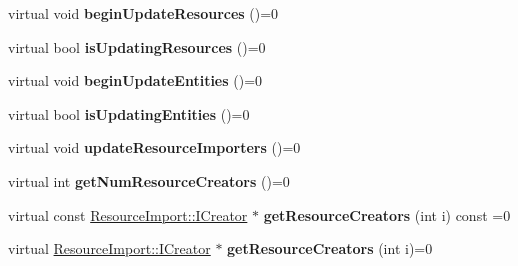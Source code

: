 \begin{DoxyCompactItemize}
\item 
virtual void {\bfseries begin\+Update\+Resources} ()=0\hypertarget{class_magnum_1_1_project_model_base_a36f50ea9a891c73149a3cf81edc87412}{}\label{class_magnum_1_1_project_model_base_a36f50ea9a891c73149a3cf81edc87412}

\item 
virtual bool {\bfseries is\+Updating\+Resources} ()=0\hypertarget{class_magnum_1_1_project_model_base_aa5b2e93a3fdf7637d91cefd2cbe365bf}{}\label{class_magnum_1_1_project_model_base_aa5b2e93a3fdf7637d91cefd2cbe365bf}

\item 
virtual void {\bfseries begin\+Update\+Entities} ()=0\hypertarget{class_magnum_1_1_project_model_base_ab17b06b43ba987c072d0725a8207a192}{}\label{class_magnum_1_1_project_model_base_ab17b06b43ba987c072d0725a8207a192}

\item 
virtual bool {\bfseries is\+Updating\+Entities} ()=0\hypertarget{class_magnum_1_1_project_model_base_a7b7be07814c6385ee6318e4ee1d571ac}{}\label{class_magnum_1_1_project_model_base_a7b7be07814c6385ee6318e4ee1d571ac}

\item 
virtual void {\bfseries update\+Resource\+Importers} ()=0\hypertarget{class_magnum_1_1_project_model_base_a05745d163734f5e11fa477f8cb53aa0e}{}\label{class_magnum_1_1_project_model_base_a05745d163734f5e11fa477f8cb53aa0e}

\item 
virtual int {\bfseries get\+Num\+Resource\+Creators} ()=0\hypertarget{class_magnum_1_1_project_model_base_a731f7532fa605f906b42533e6884ef8b}{}\label{class_magnum_1_1_project_model_base_a731f7532fa605f906b42533e6884ef8b}

\item 
virtual const \hyperlink{class_magnum_1_1_resource_import_1_1_i_creator}{Resource\+Import\+::\+I\+Creator} $\ast$ {\bfseries get\+Resource\+Creators} (int i) const  =0\hypertarget{class_magnum_1_1_project_model_base_aa37e1cc5dda041e4c16d33e2b76ec3ca}{}\label{class_magnum_1_1_project_model_base_aa37e1cc5dda041e4c16d33e2b76ec3ca}

\item 
virtual \hyperlink{class_magnum_1_1_resource_import_1_1_i_creator}{Resource\+Import\+::\+I\+Creator} $\ast$ {\bfseries get\+Resource\+Creators} (int i)=0\hypertarget{class_magnum_1_1_project_model_base_a54e7deac9de8668cf32865b0119aba0d}{}\label{class_magnum_1_1_project_model_base_a54e7deac9de8668cf32865b0119aba0d}


\end{DoxyCompactItemize}
